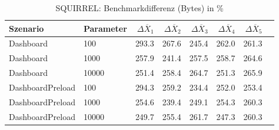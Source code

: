 
\begin{table}[ht]
\setlength{\extrarowheight}{-1pt}
\centering
\caption{SQUIRREL: Benchmarkdifferenz (Bytes) in \%}
\begin{tabular}{llrrrrrr}
\toprule
Szenario & Parameter & ${\Delta \overline{X}_1}$ & ${\Delta \overline{X}_2}$ & ${\Delta \overline{X}_3}$ & ${\Delta \overline{X}_4}$ & ${\Delta \overline{X}_5}$ \\
\midrule
	Dashboard & 100 & \cellcolor{red!30}  293.3 & \cellcolor{red!30}  267.6 & \cellcolor{red!30}  245.4 & \cellcolor{red!30}  262.0 & \cellcolor{red!30}  261.3 \\
	Dashboard & 1000 & \cellcolor{red!30}  257.9 & \cellcolor{red!30}  241.4 & \cellcolor{red!30}  257.5 & \cellcolor{red!30}  258.7 & \cellcolor{red!30}  264.6 \\
	Dashboard & 10000 & \cellcolor{red!30}  251.4 & \cellcolor{red!30}  258.4 & \cellcolor{red!30}  264.7 & \cellcolor{red!30}  251.3 & \cellcolor{red!30}  265.9 \\
	DashboardPreload & 100 & \cellcolor{red!30}  294.3 & \cellcolor{red!30}  259.2 & \cellcolor{red!30}  234.4 & \cellcolor{red!30}  252.0 & \cellcolor{red!30}  253.4 \\
	DashboardPreload & 1000 & \cellcolor{red!30}  254.6 & \cellcolor{red!30}  239.4 & \cellcolor{red!30}  249.1 & \cellcolor{red!30}  254.3 & \cellcolor{red!30}  260.3 \\
	DashboardPreload & 10000 & \cellcolor{red!30}  249.7 & \cellcolor{red!30}  255.4 & \cellcolor{red!30}  261.7 & \cellcolor{red!30}  247.3 & \cellcolor{red!30}  260.3 \\
\bottomrule
\end{tabular}
\label{tab:benchmarkdifferenz_squirrel_bytes}
\end{table}
	